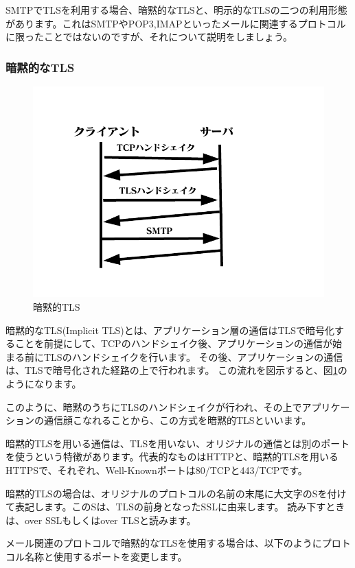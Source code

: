 SMTPでTLSを利用する場合、暗黙的なTLSと、明示的なTLSの二つの利用形態があります。これはSMTPやPOP3,IMAPといったメールに関連するプロトコルに限ったことではないのですが、それについて説明をしましょう。

\subsubsection{暗黙的なTLS}

\begin{figure}[htbp]
	\includegraphics[width=12cm,clip]{draw/implicit.pdf}
	\caption{暗黙的TLS}
	\label{fig:implicit_TLS}
\end{figure}

暗黙的なTLS(Implicit TLS)とは、アプリケーション層の通信はTLSで暗号化することを前提にして、TCPのハンドシェイク後、アプリケーションの通信が始まる前にTLSのハンドシェイクを行います。
その後、アプリケーションの通信は、TLSで暗号化された経路の上で行われます。
この流れを図示すると、図\ref{fig:implicit_TLS}のようになります。

このように、暗黙のうちにTLSのハンドシェイクが行われ、その上でアプリケーションの通信顔こなれることから、この方式を暗黙的TLSといいます。

暗黙的TLSを用いる通信は、TLSを用いない、オリジナルの通信とは別のポートを使うという特徴があります。代表的なものはHTTPと、暗黙的TLSを用いるHTTPSで、それぞれ、Well-Knownポートは80/TCPと443/TCPです。

暗黙的TLSの場合は、オリジナルのプロトコルの名前の末尾に大文字のSを付けて表記します。このSは、TLSの前身となったSSLに由来します。
読み下すときは、over SSLもしくはover TLSと読みます。

メール関連のプロトコルで暗黙的なTLSを使用する場合は、以下のようにプロトコル名称と使用するポートを変更します。

